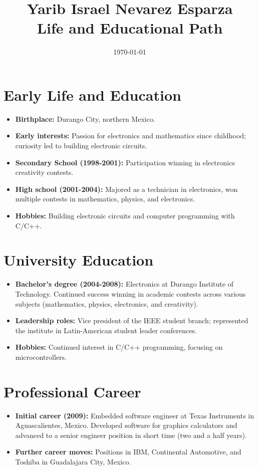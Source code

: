 \documentclass{article}
\title{Yarib Israel Nevarez Esparza \\ Life and Educational Path}
\author{}
\date{\today}
\begin{document}
	
	\maketitle
	\vspace{-10mm} %
	
	\section*{Early Life and Education}
	\begin{itemize}
    \item \textbf{Birthplace:} Durango City, northern Mexico.
    \item \textbf{Early interests:} Passion for electronics and mathematics since childhood; curiosity led to building electronic circuits.
    \item \textbf{Secondary School (1998-2001):} Participation winning in electronics creativity contests.
    \item \textbf{High school (2001-2004):} Majored as a technician in electronics, won multiple contests in mathematics, physics, and electronics.
    \item \textbf{Hobbies:} Building electronic circuits and computer programming with C/C++.
\end{itemize}

\section*{University Education}
\begin{itemize}[noitemsep]
    \item \textbf{Bachelor's degree (2004-2008):} Electronics at Durango Institute of Technology. Continued success winning in academic contests across various subjects (mathematics, physics, electronics, and creativity). 
    \item \textbf{Leadership roles:} Vice president of the IEEE student branch; represented the institute in Latin-American student leader conferences.
    \item \textbf{Hobbies:} Continued interest in C/C++ programming, focusing on microcontrollers.
\end{itemize}

\section*{Professional Career}
\begin{itemize}[noitemsep]
    \item \textbf{Initial career (2009):} Embedded software engineer at Texas Instruments in Aguascalientes, Mexico. Developed software for graphics calculators and advanced to a senior engineer position in short time (two and a half years).
    \item \textbf{Further career moves:} Positions in IBM, Continental Automotive, and Toshiba in Guadalajara City, Mexico.
\end{itemize}
\end{document}
